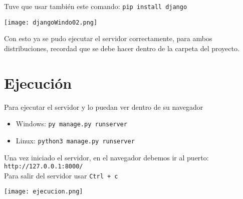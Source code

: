 Tuve que usar también este comando: \texttt{pip install django}

\begin{center}
    \texttt{[image: djangoWindo02.png]}
\end{center}

Con esto ya se pudo ejecutar el servidor correctamente, para ambos distribuciones, recordad que se debe hacer dentro de la carpeta del proyecto.

\newpage
\section{Ejecución}

Para ejecutar el servidor y lo puedan ver dentro de su navegador

\begin{itemize}
    \item Windows:  \texttt{py manage.py runserver}    
    \item Linux: \texttt{python3 manage.py runserver}
\end{itemize}

Una vez iniciado el servidor, en el navegador debemos ir al puerto: \texttt{http://127.0.0.1:8000/}\\

Para salir del servidor usar \texttt{Ctrl + c}

\begin{center}
    \texttt{[image: ejecucion.png]}
\end{center}